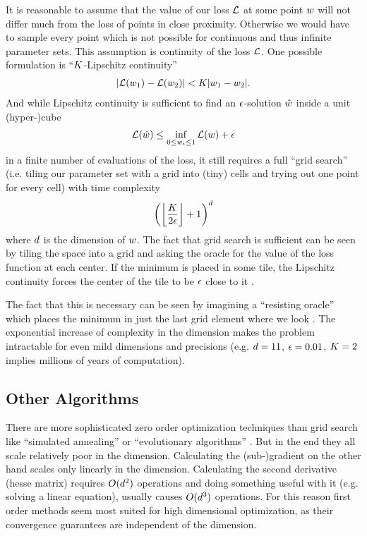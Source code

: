 It is reasonable to assume that the value of our loss \(\mathcal{L}\) at some point
\(w\) will not differ much from the loss of points in close proximity.
Otherwise we would have to sample every point which is not possible for continuous
and thus infinite parameter sets. This assumption is continuity of the loss
\(\mathcal{L}\). One possible formulation is ``\(K\)-Lipschitz continuity''
%
\begin{align*}
	| \mathcal{L}(w_1) - \mathcal{L}(w_2) | < K | w_1 - w_2 |.
\end{align*}
%
And while Lipschitz continuity is sufficient to find an \(\epsilon\)-solution
\(\hat{w}\) inside a unit (hyper-)cube
%
\begin{align*}
	\mathcal{L}(\hat{w}) \le \inf_{ 0\le w_i\le 1} \mathcal{L}(w) + \epsilon
\end{align*}
%
in a finite number of evaluations of the loss, it still requires a full
``grid search'' (i.e. tiling our parameter set with a grid into (tiny) cells
and trying out one point for every cell) with time complexity \parencite[pp.
12,13]{nesterovLecturesConvexOptimization2018}
%
\begin{align*}
	\left(\left\lfloor \frac{K}{2\epsilon}\right\rfloor + 1\right)^d
\end{align*}
%
where \(d\) is the dimension of \(w\). The fact that grid search is
sufficient can be seen by tiling the space into a grid and asking the oracle
for the value of the loss function at each center. If the minimum is placed in
some tile, the Lipschitz continuity forces the center of the tile to be \(\epsilon\)
close to it \parencite[cf.][p. 11]{nesterovLecturesConvexOptimization2018}.

The fact that this is necessary can be seen by imagining a ``resisting
oracle'' which places the minimum in just the last grid element where we look
\parencite[cf.][p. 13]{nesterovLecturesConvexOptimization2018}. The exponential
increase of complexity in the dimension makes the problem intractable for even
mild dimensions and precisions (e.g. \(d=11\), \(\epsilon=0.01\), \(K=2\)
implies millions of years of computation).

\subsection{Other Algorithms}

There are more sophisticated zero order optimization techniques than grid
search like ``simulated annealing'' \parencite[e.g.][]{bouttierConvergenceRateSimulated2019}
or ``evolutionary algorithms'' \parencite[e.g.][]{heConditionsConvergenceEvolutionary2001}.
But in the end they all scale relatively poor in the dimension. Calculating the
\mbox{(sub-)gradient} on the other hand scales only linearly in the dimension.
Calculating the second derivative (hesse matrix) requires \(O(d^2)\)
operations and doing something useful with it (e.g. solving a linear
equation), usually causes \(O(d^3)\) operations. For this reason first
order methods seem most suited for high dimensional optimization, as their
convergence guarantees are independent of the dimension.

